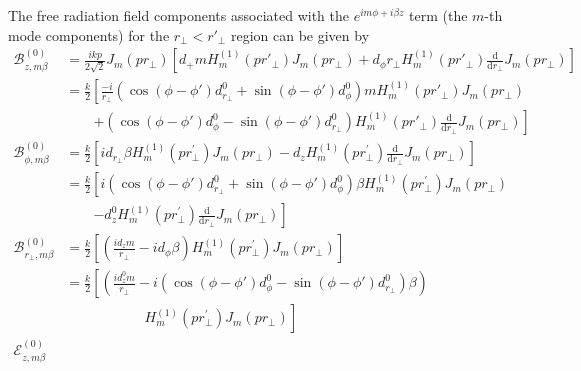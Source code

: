 \documentclass[]{report}
\begin{document}
The free radiation field components associated with the $ e^{im\phi+i\beta z} $ term (the $m$-th mode components) for the $r\!_\perp<r'\!_\perp$ region can be given by
\begin{align}
\mathcal{B}_{z,m\beta}^{(0)} &= \frac{ikp}{2\sqrt{2}}J_m(pr\!_\perp)\left[ d_{+}m H_m^{(1)}(pr'\!\!_\perp)J_m(pr\!_\perp) \!+\! d_\phi r\!_\perp H_m^{(1)}(pr'\!_\perp) \frac{\mathrm{d}}{\mathrm{d}r\!_\perp}J_m(pr\!_\perp)\right]\\
&= \frac{k}{2}\left[\frac{-\! i}{r\!_\perp}\left(\cos(\phi\!-\!\phi')d^0_{r\!_\perp}\!\!+\!\sin(\phi\!-\!\phi')d^0_\phi\right)m H_m^{(1)}(pr'\!\!_\perp)J_m(pr\!_\perp)\right. \nonumber\\
&\quad\quad \left.+ \left(\cos(\phi\!-\!\phi')d^0_\phi\!-\!\sin(\phi\!-\!\phi')d^0_{r\!_\perp}\right)  H_m^{(1)}(pr'\!_\perp) \frac{\mathrm{d}}{\mathrm{d}r\!_\perp}J_m(pr\!_\perp)\right]\\
\mathcal{B}_{\phi,m\beta}^{(0)} &= \frac{k}{2}\left[ id_{r\!_\perp}\beta H_m^{(1)}\left( {pr\!_\perp^{\prime} }\right) J_m\left( pr\!_\perp \right)-d_z H_m^{(1)}\left( {pr\!_\perp^{\prime} }\right) \frac{\mathrm{d}}{\mathrm{d}r\!_\perp}J_m\left( pr\!_\perp \right) \right]\\
&=\frac{k}{2}\left[ i\left(\cos(\phi\!-\!\phi')d^0_{r\!_\perp}\!\!+\!\sin(\phi\!-\!\phi')d^0_\phi\right)\beta H_m^{(1)}\left( {pr\!_\perp^{\prime} }\right) J_m\left( pr\!_\perp \right)\phantom{\frac{d}{dr\!_\perp}}\right.\nonumber\\
&\quad\quad\left.-d^0_z H_m^{(1)}\left( {pr\!_\perp^{\prime} }\right) \frac{\mathrm{d}}{\mathrm{d}r\!_\perp}J_m\left( pr\!_\perp \right) \right]\\
\mathcal{B}_{r\!_\perp, m\beta}^{(0)} &= \frac{k}{2}\left[(\frac{id_z m}{r\!_\perp}- id_\phi \beta)H_m^{(1)}\left( {pr\!_\perp^{\prime} }\right) J_m\left( pr\!_\perp \right)   \right]\\
&= \frac{k}{2}\left[\left(\frac{id^0_z m}{r\!_\perp}- i\left(\cos(\phi\!-\!\phi')d^0_\phi\!-\!\sin(\phi\!-\!\phi')d^0_{r\!_\perp}\right) \beta\right)\right.\nonumber\\
&\qquad\qquad\left.\phantom{\frac{id^0_z m}{r\!_\perp}} H_m^{(1)}\left( {pr\!_\perp^{\prime} }\right)J_m\left( pr\!_\perp \right)   \right]\\
\mathcal{E}_{z,m\beta}^{(0)} 

\end{align}
\end{document}
